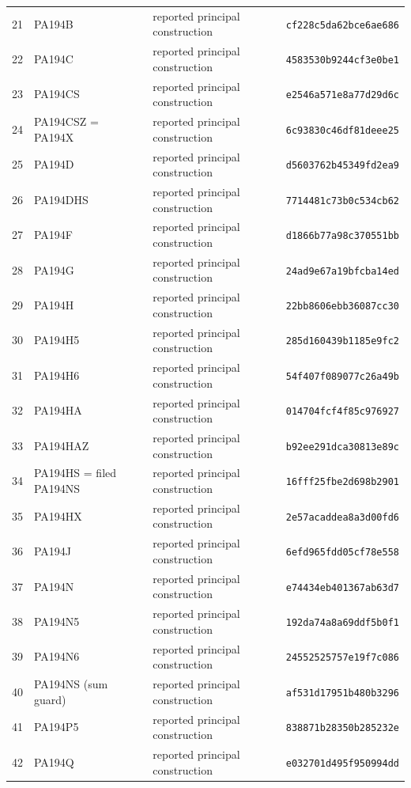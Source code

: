 \begin{longtable}{p{.06\linewidth}>{\raggedright\arraybackslash}p{.30\linewidth}>{\raggedright\arraybackslash}p{.21\linewidth}p{.31\linewidth}}
21 & PA194B & reported principal construction & \texttt{cf228c5da62bce6ae686} \\
22 & PA194C & reported principal construction & \texttt{4583530b9244cf3e0be1} \\
23 & PA194CS & reported principal construction & \texttt{e2546a571e8a77d29d6c} \\
24 & PA194CSZ = PA194X & reported principal construction & \texttt{6c93830c46df81deee25} \\
25 & PA194D & reported principal construction & \texttt{d5603762b45349fd2ea9} \\
26 & PA194DHS & reported principal construction & \texttt{7714481c73b0c534cb62} \\
27 & PA194F & reported principal construction & \texttt{d1866b77a98c370551bb} \\
28 & PA194G & reported principal construction & \texttt{24ad9e67a19bfcba14ed} \\
29 & PA194H & reported principal construction & \texttt{22bb8606ebb36087cc30} \\
30 & PA194H5 & reported principal construction & \texttt{285d160439b1185e9fc2} \\
31 & PA194H6 & reported principal construction & \texttt{54f407f089077c26a49b} \\
32 & PA194HA & reported principal construction & \texttt{014704fcf4f85c976927} \\
33 & PA194HAZ & reported principal construction & \texttt{b92ee291dca30813e89c} \\
34 & PA194HS = filed PA194NS & reported principal construction & \texttt{16fff25fbe2d698b2901} \\
35 & PA194HX & reported principal construction & \texttt{2e57acaddea8a3d00fd6} \\
36 & PA194J & reported principal construction & \texttt{6efd965fdd05cf78e558} \\
37 & PA194N & reported principal construction & \texttt{e74434eb401367ab63d7} \\
38 & PA194N5 & reported principal construction & \texttt{192da74a8a69ddf5b0f1} \\
39 & PA194N6 & reported principal construction & \texttt{24552525757e19f7c086} \\
40 & PA194NS (sum guard) & reported principal construction & \texttt{af531d17951b480b3296} \\
41 & PA194P5 & reported principal construction & \texttt{838871b28350b285232e} \\
42 & PA194Q & reported principal construction & \texttt{e032701d495f950994dd} \\

\end{longtable}
